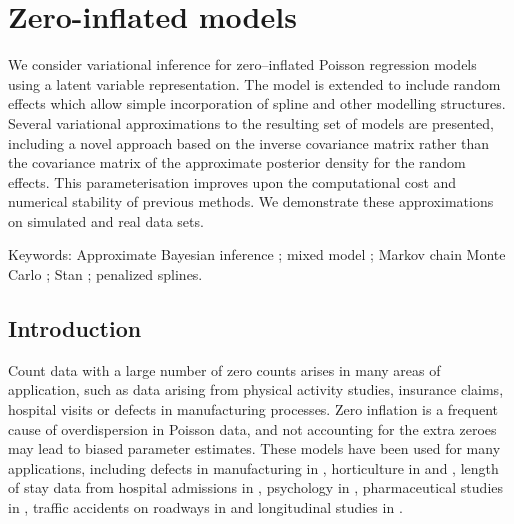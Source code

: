 \chapter{Zero-inflated models}

	\noindent We consider variational inference for zero--inflated Poisson regression models using a latent
	variable representation. The model is extended to include random effects which allow simple incorporation of
	spline and other modelling structures. Several variational approximations to the resulting set of models are
	presented, including a novel approach based on the inverse covariance matrix rather than the covariance matrix
	of the approximate posterior density for the random effects. This parameterisation improves upon the
	computational cost and numerical stability of previous methods. We demonstrate these approximations on
	simulated and real data sets.
 
\noindent Keywords: Approximate Bayesian inference ; mixed model ; Markov chain Monte Carlo ; Stan ; penalized splines.


\section{Introduction}
\label{sec:introduction}


Count data with a large number of zero counts arises in many areas of application, such as data arising from
physical activity studies, insurance claims, hospital visits or defects in manufacturing processes. Zero
inflation is a frequent cause of overdispersion in Poisson data, and not accounting for the extra zeroes may
lead to biased parameter estimates. These models have been used for many applications, including defects in
manufacturing in \citep{lambert1992}, horticulture in \citep{BIOM:BIOM1030} and \citep{BIOM:BIOM1030}, length
of stay data from hospital admissions in \citep{BIMJ:BIMJ200390024}, psychology in \citep{JOFP:rethink},
pharmaceutical studies in \citep{Min01042005}, traffic accidents on roadways in \citep{Shankar1997829} and
longitudinal studies in \citep{LeeWangScottYauMcLachlan2006}.

